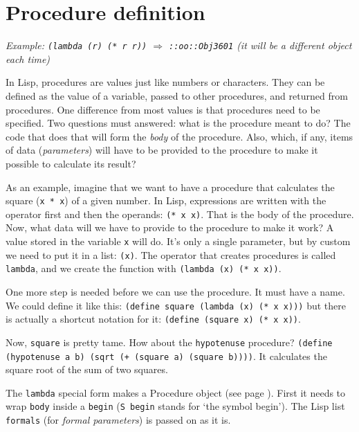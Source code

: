 \documentclass[a5paper,draft]{memoir}
\begin{document}
\section{Procedure definition}
\label{procedure-definition}

\emph{Example: \texttt{(lambda (r) (* r r))} $\Rightarrow$ \texttt{::oo::Obj3601} (it will be a different object each time)}

In Lisp, procedures are values just like numbers or characters. They can be defined as the value of a variable, passed to other procedures, and returned from procedures. One difference from most values is that procedures need to be specified. Two questions must answered: what is the procedure meant to do? The code that does that will form the \emph{body} of the procedure. Also, which, if any, items of data (\emph{parameters}) will have to be provided to the procedure to make it possible to calculate its result?

As an example, imagine that we want to have a procedure that calculates the square (\texttt{x * x}) of a given number. In Lisp, expressions are written with the operator first and then the operands: \texttt{(* x x)}. That is the body of the procedure. Now, what data will we have to provide to the procedure to make it work? A value stored in the variable \texttt{x} will do. It's only a single parameter, but by custom we need to put it in a list: \texttt{(x)}. The operator that creates procedures is called \texttt{lambda}, and we create the function with \texttt{(lambda (x) (* x x))}.

One more step is needed before we can use the procedure. It must have a name. We could define it like this: \texttt{(define square (lambda (x) (* x x)))} but there is actually a shortcut notation for it: \texttt{(define (square x) (* x x))}.

Now, \texttt{square} is pretty tame. How about the \texttt{hypotenuse} procedure? \texttt{(define (hypotenuse a b) (sqrt (+ (square a) (square b))))}. It calculates the square root of the sum of two squares.

The \texttt{lambda} special form makes a Procedure object (see page \pageref{control}). First it needs to wrap \texttt{body} inside a \texttt{begin} (\texttt{S begin} stands for `the symbol begin'). The Lisp list \texttt{formals} (for \emph{formal parameters}) is passed on as it is.
\end{document}
